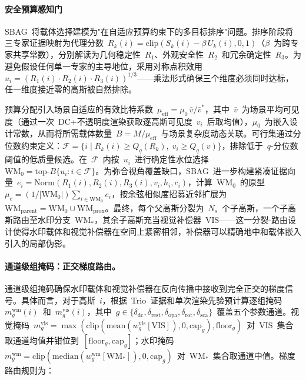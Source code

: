 \paragraph{安全预算感知门}
SBAG~将载体选择建模为"在自适应预算约束下的多目标排序"问题。排序阶段将三专家证据映射为代理分数~$R_k(i) = \mathrm{clip}(S_k(i) - \beta\, U_k(i), 0, 1)$（$\beta$~为跨专家共享常数），分别解读为几何稳定性~$R_1$、外观安全性~$R_2$~和冗余确定性~$R_3$。为避免假设任何单一专家的主导地位，采用对称点积效用~$u_i = (R_1(i) \cdot R_2(i) \cdot R_3(i))^{1/3}$——乘法形式确保三个维度必须同时达标，任一维度接近零的高斯被自然排除。

预算分配引入场景自适应的有效比特系数~$\mu_{\mathrm{eff}} = \mu_0\,\bar{v}/\bar{v}^*$，其中~$\bar{v}$~为场景平均可见度（通过一次~DC+不透明度渲染获取逐高斯可见度~$v_i$~后取均值），$\mu_0$~为嵌入设计常数，从而将所需载体数量~$B = M / \mu_{\mathrm{eff}}$~与场景复杂度动态关联。可行集通过分位数约束定义：$\mathcal{F} = \{i \mid R_k(i) \geq Q_q(R_k),\; v_i \geq Q_q(v)\}$，排除低于~$q$-分位数阈值的低质量候选。在~$\mathcal{F}$~内按~$u_i$~进行确定性水位选择~$\mathrm{WM}_0 = \mathrm{top}\text{-}B\{u_i : i \in \mathcal{F}\}$。为弥合视角覆盖缺口，SBAG~进一步构建紧凑证据向量~$e_i = \mathrm{Norm}(R_1(i), R_2(i), R_3(i), v_i, h_i, c_i)$，计算~$\mathrm{WM}_0$~的原型~$\mu_e = (1/|\mathrm{WM}_0|)\sum_{i \in \mathrm{WM}_0} e_i$，按余弦相似度招募近邻扩展为~$\mathrm{WM}_{\mathrm{parent}} = \mathrm{WM}_0 \cup \mathrm{WM}_{\mathrm{prox}}$。最终，每个父高斯分裂为~$N_s$~个子高斯，一个子高斯路由至水印分支~$\mathrm{WM}_*$，其余子高斯充当视觉补偿器~$\mathrm{VIS}$——这一分裂-路由设计使得水印载体和视觉补偿器在空间上紧密相邻，补偿器可以精确地中和载体嵌入引入的局部伪影。

\paragraph{通道级组掩码：正交梯度路由。}
通道级组掩码确保水印载体和视觉补偿器在反向传播中接收到完全正交的梯度信号。具体而言，对于高斯~$i$，根据~Trio~证据和单次渲染先验预计算逐组掩码~$m_g^{\mathrm{wm}}(i)$~和~$m_g^{\mathrm{vis}}(i)$，其中~$g \in \{\delta_{\mathrm{dc}}, \delta_{\mathrm{rest}}, \delta_{\mathrm{opa}}, \delta_{\mathrm{rot}}, \delta_{\mathrm{sca}}\}$~覆盖五个参数通道。视觉掩码~$m_g^{\mathrm{vis}} = \max(\mathrm{clip}(\mathrm{mean}(w_g^{\mathrm{vis}}[\mathrm{VIS}]), 0, \mathrm{cap}_g), \mathrm{floor}_g)$~对~VIS~集合取通道均值并钳位到~$[\mathrm{floor}_g, \mathrm{cap}_g]$；水印掩码~$m_g^{\mathrm{wm}} = \mathrm{clip}(\mathrm{median}(w_g^{\mathrm{wm}}[\mathrm{WM}_*]), 0, \mathrm{cap}_g)$~对~$\mathrm{WM}_*$~集合取通道中值。梯度路由规则为：

